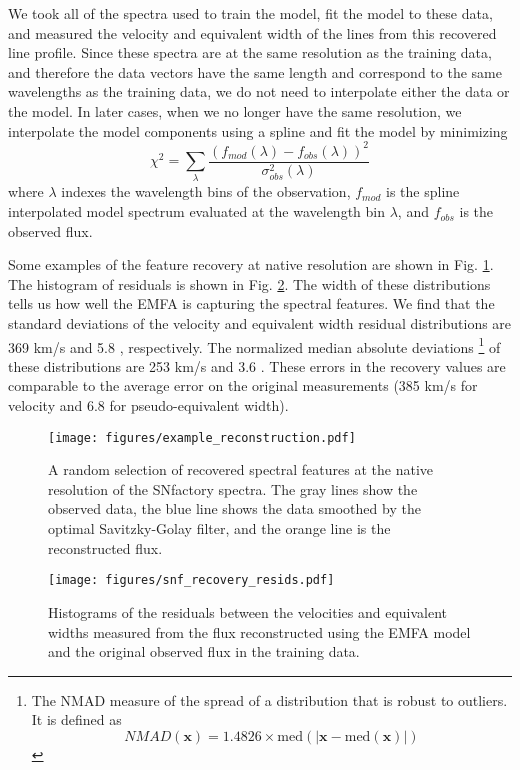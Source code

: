 We took all of the spectra used to train the model, fit the model to these data, and measured the velocity and equivalent width of the lines from this recovered line profile. Since these spectra are at the same resolution as the training data, and therefore the data vectors have the same length and correspond to the same wavelengths as the training data, we do not need to interpolate either the data or the model. In later cases, when we no longer have the same resolution, we interpolate the model components using a spline and fit the model by minimizing
\begin{equation}
    \chi^2 = \displaystyle\sum_\lambda \frac{(f_{mod}(\lambda)-f_{obs}(\lambda))^2}{\sigma_{obs}^2(\lambda)}
\end{equation}
where $\lambda$ indexes the wavelength bins of the observation, $f_{mod}$ is the spline interpolated model spectrum evaluated at the wavelength bin $\lambda$, and $f_{obs}$ is the observed flux.

Some examples of the feature recovery at native resolution are shown in Fig. \ref{feature_recovery}. The histogram of residuals is shown in Fig. \ref{snf_hist_resids_native_resolution}. The width of these distributions tells us how well the EMFA is capturing the spectral features. We find that the standard deviations of the velocity and equivalent width residual distributions are 369 km/s and 5.8 \angstrom, respectively. The normalized median absolute deviations \footnote{The NMAD measure of the spread of a distribution that is robust to outliers. It is defined as $$NMAD(\mathbf{x}) = 1.4826\times\text{med}(|\mathbf{x}-\text{med}(\mathbf{x})|)$$} of these distributions are 253 km/s and 3.6 \angstrom. These errors in the recovery values are comparable to the average error on the original measurements (385 km/s for velocity and 6.8 \angstrom\; for pseudo-equivalent width). 

\begin{figure}[!htb]
    \centering
    \texttt{[image: figures/example\_reconstruction.pdf]}
    \caption{A random selection of recovered spectral features at the native resolution of the SNfactory spectra. The gray lines show the observed data, the blue line shows the data smoothed by the optimal Savitzky-Golay filter, and the orange line is the reconstructed flux.}
    \label{feature_recovery}
\end{figure}

\begin{figure}[!htb]
    \centering
    \texttt{[image: figures/snf\_recovery\_resids.pdf]}
    \caption{Histograms of the residuals between the velocities and equivalent widths measured from the flux reconstructed using the EMFA model and the original observed flux in the training data.}
    \label{snf_hist_resids_native_resolution}
\end{figure}

